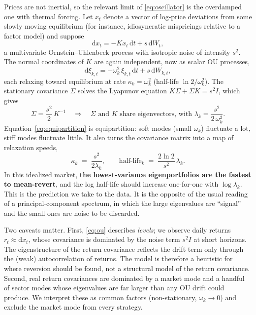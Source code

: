 Prices are not inertial, so the relevant limit of
\eqref{eq:oscillator} is the overdamped one with thermal forcing. Let
$x_t$ denote a vector of log-price deviations from some slowly moving
equilibrium (for instance, idiosyncratic mispricings relative to a
factor model) and suppose
\begin{equation}
  \mathrm{d}x_t = -K x_t\,\mathrm{d}t + s\,\mathrm{d}W_t ,
  \label{eq:ou}
\end{equation}
a multivariate Ornstein--Uhlenbeck process \citep{uhlenbeck1930} with
isotropic noise of intensity $s^2$. The normal coordinates of $K$ are
again independent, now as scalar OU processes,
\begin{equation}
  \mathrm{d}\xi_{k,t} = -\omega_k^2\,\xi_{k,t}\,\mathrm{d}t + s\,\mathrm{d}W_{k,t},
\end{equation}
each relaxing toward equilibrium at rate $\kappa_k=\omega_k^2$ (half-life
$\ln 2/\omega_k^2$). The stationary covariance $\Sigma$ solves the
Lyapunov equation $K\Sigma + \Sigma K = s^2 I$, which gives
\begin{equation}
  \Sigma = \frac{s^2}{2}\,K^{-1}
  \quad\Longrightarrow\quad
  \Sigma \text{ and } K \text{ share eigenvectors, with }
  \lambda_k = \frac{s^2}{2\,\omega_k^2}.
  \label{eq:equipartition}
\end{equation}
Equation~\eqref{eq:equipartition} is equipartition: soft modes (small
$\omega_k$) fluctuate a lot, stiff modes fluctuate little. It also turns
the covariance matrix into a map of relaxation speeds,
\begin{equation}
  \kappa_k \;=\; \frac{s^2}{2\lambda_k},
  \qquad
  \text{half-life}_k \;=\; \frac{2\ln 2}{s^2}\,\lambda_k .
  \label{eq:prediction}
\end{equation}
In this idealized market, \textbf{the lowest-variance eigenportfolios
are the fastest to mean-revert}, and the log half-life should increase
one-for-one with $\log\lambda_k$. This is the prediction we take to the
data. It is the opposite of the usual reading of a principal-component
spectrum, in which the large eigenvalues are ``signal'' and the small
ones are noise to be discarded.

Two caveats matter. First, \eqref{eq:ou} describes \emph{levels};
we observe daily returns $r_t\approx \mathrm{d}x_t$, whose covariance
is dominated by the noise term $s^2 I$ at short horizons. The
eigenstructure of the return covariance reflects the drift term only
through the (weak) autocorrelation of returns. The model is therefore
a heuristic for where reversion should be found, not a structural
model of the return covariance. Second, real return covariances are
dominated by a market mode and a handful of sector modes whose
eigenvalues are far larger than any OU drift could produce. We
interpret these as common factors (non-stationary, $\omega_k\to 0$)
and exclude the market mode from every strategy.

